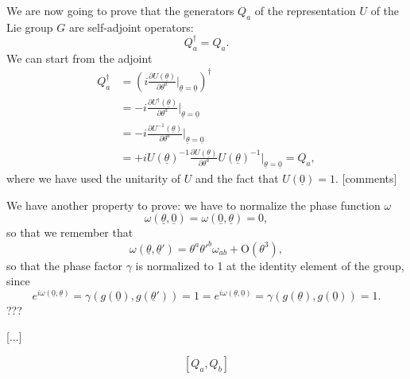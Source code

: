 We are now going to prove that the generators \(Q_a\) of the representation \(U\) of the Lie group \(G\) are self-adjoint operators:
\[
    Q_a^{\dagger} = Q_a.
\]
We can start from the adjoint
\[
    \begin{aligned}
        Q_a^{\dagger} & = \left(i \frac{\partial U(\underline{\theta})}{\partial \theta^a} \Big|_{\underline{\theta} = \underline{0}}\right)^{\dagger}                                        \\
                      & = -i \frac{\partial U^{\dagger}(\underline{\theta})}{\partial \theta^a} \Big|_{\underline{\theta} = \underline{0}}                                                    \\
                      & = -i \frac{\partial U^{-1}(\underline{\theta})}{\partial \theta^a} \Big|_{\underline{\theta} = \underline{0}}                                                         \\
                      & = +i U(\underline{\theta})^{-1} \frac{\partial U(\underline{\theta})}{\partial \theta^a} U(\underline{\theta})^{-1} \Big|_{\underline{\theta} = \underline{0}} = Q_a,
    \end{aligned}
\]
where we have used the unitarity of \(U\) and the fact that \(U(\underline{0}) = 1\). [comments]

We have another property to prove: we have to normalize the phase function \(\omega\)
\[
    \omega(\underline{\theta}, \underline{0}) = \omega(\underline{0}, \underline{\theta}) = 0,
\]
so that we remember that
\[
    \omega(\underline{\theta}, \underline{\theta}') = \theta^a \theta'^b \omega_{ab} + \mathrm{O}(\theta^3),
\]
so that the phase factor \(\gamma\) is normalized to 1 at the identity element of the group, since
\[
    e^{i \omega(\underline{0}, \underline{\theta})} = \gamma(g(\underline{0}), g(\underline{\theta}')) = 1 = e^{i \omega(\underline{\theta}, \underline{0})} = \gamma(g(\underline{\theta}), g(\underline{0})) = 1.
\]
???

[...]

\[
    \left[ Q_a, Q_b \right]
\]

